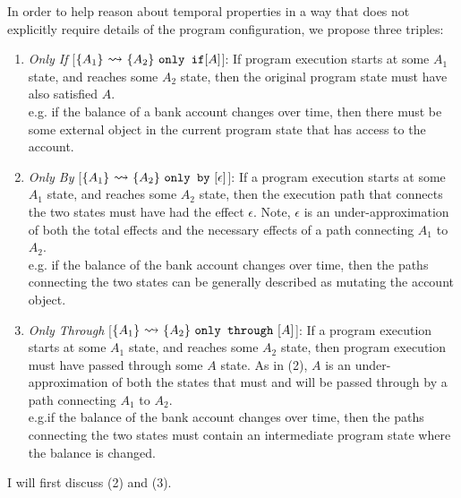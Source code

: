 \documentclass[12pt]{article}
\newcommand\trans[1]{\overset{#1}{\mathlarger{\mathlarger \leadsto}}}
\newcommand\onlyIf[3]{\{#1\}\ \trans{}\ \{#2\}\ \texttt{only if} [#3]}
\newcommand\onlyBy[3]{\{#1\}\ \trans{}\ \{#2\}\ \texttt{only by}\ [#3]}
\newcommand\onlyThrough[3]{\{#1\}\ \trans{}\ \{#2\}\ \texttt{only through}\ [#3]}
\begin{document}
In order to help reason about temporal properties in a way that does not explicitly require details of the program 
configuration, we propose three triples: 

\begin{enumerate}
\item
\emph{Only If} [$\onlyIf{A_1}{A_2}{A}$]: If program execution starts at some $A_1$ state, and reaches some $A_2$ state, 
then the original program state must have also satisfied $A$.\\
e.g. if the balance of a bank account changes over time, then there must be some external object in the current 
program state that has access to the account.
\item
\emph{Only By} [$\onlyBy{A_1}{A_2}{\epsilon}$]:  If a program execution starts at some $A_1$ state, and reaches some $A_2$ state, then the execution path that connects the two states must have had the effect $\epsilon$. Note, $\epsilon$ is an under-approximation of 
both the total effects and the necessary effects of a path connecting $A_1$ to $A_2$.\\
e.g. if the balance of the bank account changes over time, then the paths connecting the two states can be generally described as 
mutating the account object.
\item
\emph{Only Through} [$\onlyThrough{A_1}{A_2}{A}$]: If a program execution starts at some $A_1$ state, and reaches some $A_2$ state, then program execution must have passed through some $A$ state.
As in (2), $A$ is an under-approximation of 
both the states that must and will be passed through by a path connecting $A_1$ to $A_2$.\\
e.g.if the balance of the bank account changes over time, then the paths connecting the two states must contain 
an intermediate program state where the balance is changed.
\end{enumerate}

I will first discuss (2) and (3).
\end{document}
